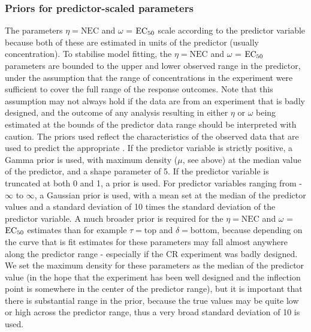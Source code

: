 \documentclass[
  shortnames]{jss}
\begin{document}
\hypertarget{priors-for-predictor-scaled-parameters}{%
\subsubsection{Priors for predictor-scaled parameters}\label{priors-for-predictor-scaled-parameters}}

The parameters \(\eta = \text{NEC}\) and \(\omega\) = \(\text{EC\textsubscript{50}}\) scale according to the predictor variable because both of these are estimated in units of the predictor (usually concentration). To stabilise model fitting, the \(\eta = \text{NEC}\) and \(\omega\) = \(\text{EC\textsubscript{50}}\) parameters are bounded to the upper and lower observed range in the predictor, under the assumption that the range of concentrations in the experiment were sufficient to cover the full range of the response outcomes. Note that this assumption may not always hold if the data are from an experiment that is badly designed, and the outcome of any analysis resulting in either \(\eta\) or \(\omega\) being estimated at the bounds of the predictor data range should be interpreted with caution. The priors used reflect the characteristics of the observed data that are used to predict the appropriate . If the predictor variable is strictly positive, a Gamma prior is used, with maximum density (\(\mu\), see above) at the median value of the predictor, and a shape parameter of 5. If the predictor variable is truncated at both 0 and 1, a  prior is used. For predictor variables ranging from -\(\infty\) to \(\infty\), a Gaussian prior is used, with a mean set at the median of the predictor values and a standard deviation of 10 times the standard deviation of the predictor variable. A much broader prior is required for the \(\eta = \text{NEC}\) and \(\omega\) = \(\text{EC\textsubscript{50}}\) estimates than for example \(\tau = \text{top}\) and \(\delta = \text{bottom}\), because depending on the curve that is fit estimates for these parameters may fall almost anywhere along the predictor range - especially if the CR experiment was badly designed. We set the maximum density for these parameters as the median of the predictor value (in the hope that the experiment has been well designed and the inflection point is somewhere in the center of the predictor range), but it is important that there is substantial range in the prior, because the true values may be quite low or high across the predictor range, thus a very broad standard deviation of 10 is used.
\end{document}
